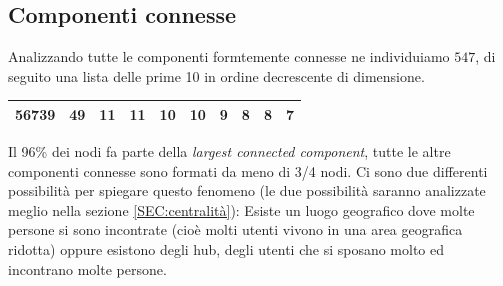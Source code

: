 \documentclass[a4paper]{article}
\newcommand{\lcc}{\textit{largest connected component}}
\begin{document}
\subsection{Componenti connesse}
Analizzando tutte le componenti formtemente connesse ne individuiamo $547$, di seguito una lista delle prime 10 in ordine decrescente di dimensione.
\begin{center}\begin{tabular}{ | c | c | c | c | c | c | c | c | c | c | }
  \hline
  56739 & 49 & 11 & 11 & 10 & 10 & 9 & 8 & 8 & 7\\
  \hline
\end{tabular}\end{center}
Il 96\% dei nodi fa parte della \lcc, tutte le altre componenti connesse sono formati da meno di 3/4 nodi. 
Ci sono due differenti possibilità per spiegare questo fenomeno (le due possibilità saranno analizzate meglio nella sezione \ref{SEC:centralità}): Esiste un luogo geografico dove molte persone si sono incontrate (cioè molti utenti vivono in una area geografica ridotta) oppure esistono degli hub, degli utenti che si sposano molto ed incontrano molte persone.
\end{document}
